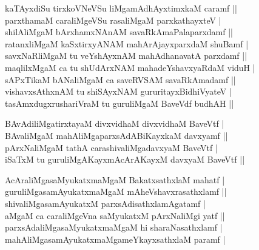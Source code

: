 \begin{entry}
\begin{shl}
kaTAyxdiSu tirxkoVNeVSu liMgamAdhAyxtimxkaM caramf ||\\[2pt]
parxthamaM caraliMgeVSu rasaliMgaM parxkathayxteV |\\[2pt]
shilAliMgaM bArxhamxNAnAM savaRkAmaPalaparxdamf ||\\[2pt]
ratanxliMgaM kaSxtirxyANAM mahArAjayxparxdaM shuBamf |\\[2pt]
savxNaRliMgaM tu veYshAyxnAM mahAdhanavatA parxdamf ||\\[2pt]
maqlilxMgaM ca tu shUdArxNAM mahadeYshavxyaRdaM viduH |\\[2pt]
sAPxTikaM bANaliMgaM ca saveRVSAM savaRkAmadamf ||\\[2pt]
vishavxsAthxnAM tu shiSAyxNAM gururitayxBidhiVyateV |\\[2pt]
tasAmxdugxrushariVraM tu guruliMgaM BaveVdf budhAH ||\\[-1pt]
\end{shl}
\medskip
{}
\smallskip
{}
\medskip
\begin{shl}
BAvAdiliMgatirxtayaM divxvidhaM divxvidhaM BaveVtf |\\[2pt]
BAvaliMgaM mahAliMgaparxsAdABiKayxkaM davxyamf ||\\[2pt]
pArxNaliMgaM tathA carashivaliMgadavxyaM BaveVtf |\\[2pt]
iSaTxM tu guruliMgAKayxmAcArAKayxM davxyaM BaveVtf ||\\[-1pt]
\end{shl}
\medskip
{}
\medskip
\begin{shl}
AcAraliMgasaMyukatxmaMgaM BakatxsathxlaM mahatf |\\[2pt]
guruliMgasamAyukatxmaMgaM mAheVshavxrasathxlamf ||\\[2pt]
shivaliMgasamAyukatxM parxsAdisathxlamAgatamf |\\[2pt]
aMgaM ca caraliMgeVna saMyukatxM pArxNaliMgi yatf ||\\[2pt]
parxsAdaliMgasaMyukatxmaMgaM hi sharaNasathxlamf |\\[2pt]
mahAliMgasamAyukatxmaMgameYkayxsathxlaM paramf |\\[-1pt]

\end{shl}
\end{entry}
